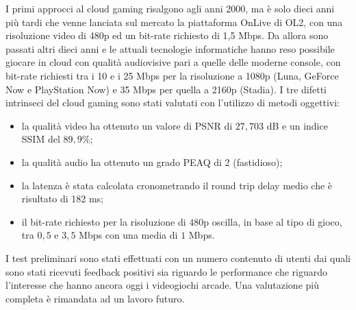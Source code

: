 I primi approcci al cloud gaming risalgono agli anni 2000, ma è solo dieci anni più tardi che venne lanciata sul mercato la piattaforma OnLive di OL2, con una risoluzione video di 480p ed un bit-rate richiesto di 1,5 Mbps. Da allora sono passati altri dieci anni e le attuali tecnologie informatiche hanno reso possibile giocare in cloud con qualità audiovisive pari a quelle delle moderne console, con bit-rate richiesti tra i 10 e i 25 Mbps per la risoluzione a 1080p (Luna, GeForce Now e PlayStation Now) e 35 Mbps per quella a 2160p (Stadia).
I tre difetti intrinseci del cloud gaming sono stati valutati con l'utilizzo di metodi oggettivi:
\begin{itemize}
	\item la qualità video ha ottenuto un valore di PSNR di $27,703$ dB e un indice SSIM del $89,9\%$;
	\item la qualità audio ha ottenuto un grado PEAQ di 2 (fastidioso);
	\item la latenza è stata calcolata cronometrando il round trip delay medio che è risultato di 182 ms;
	\item il bit-rate richiesto per la risoluzione di 480p oscilla, in base al tipo di gioco, tra $0,5$ e $3,5$ Mbps con una media di $1$ Mbps.
\end{itemize}
I test preliminari sono stati effettuati con un numero contenuto di utenti dai quali sono stati ricevuti feedback positivi sia riguardo le performance che riguardo l'interesse che hanno ancora oggi i videogiochi arcade. Una valutazione più completa è rimandata ad un lavoro futuro.

